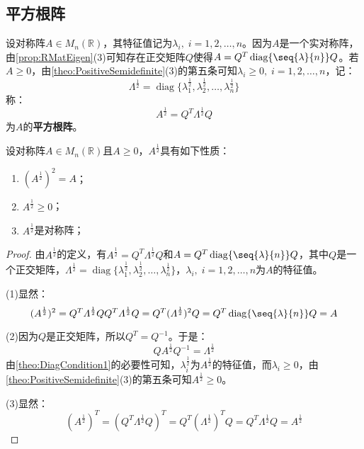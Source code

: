 \subsection{平方根阵}
\begin{definition}
	设对称阵$A\in M_n(\mathbb{R})$，其特征值记为$\lambda_i,\;i=1,2,\dots,n$。因为$A$是一个实对称阵，由\cref{prop:RMatEigen}(3)可知存在正交矩阵$Q$使得$A=Q^T\operatorname{diag}\{\seq{\lambda}{n}\}Q$。若$A\geqslant0$，由\cref{theo:PositiveSemidefinite}(3)的第五条可知$\lambda_i\geqslant0,\;i=1,2,\dots,n$，记：
	\begin{equation*}
		\varLambda^{\frac{1}{2}}=\operatorname{diag}\{\lambda_1^{\frac{1}{2}},\lambda_2^{\frac{1}{2}},\dots,\lambda_n^{\frac{1}{2}}\}
	\end{equation*}
	称：
	\begin{equation*}
		A^{\frac{1}{2}}=Q^T\varLambda^{\frac{1}{2}} Q
	\end{equation*}
	为$A$的\textbf{平方根阵}。
\end{definition}
\begin{property}\label{prop:SquareRootMat}
	设对称阵$A\in M_n(\mathbb{R})$且$A\geqslant0$，$A^{\frac{1}{2}}$具有如下性质：
	\begin{enumerate}
		\item $(A^{\frac{1}{2}})^2=A$；
		\item $A^{\frac{1}{2}}\geqslant0$；
		\item $A^{\frac{1}{2}}$是对称阵；
	\end{enumerate}
\end{property}
\begin{proof}
	由$A^{\frac{1}{2}}$的定义，有$A^{\frac{1}{2}}=Q^T\varLambda^{\frac{1}{2}}Q$和$A=Q^T\operatorname{diag}\{\seq{\lambda}{n}\}Q$，其中$Q$是一个正交矩阵，$\varLambda^{\frac{1}{2}}=\operatorname{diag}\{\lambda_1^{\frac{1}{2}},\lambda_2^{\frac{1}{2}},\dots,\lambda_n^{\frac{1}{2}}\}$，$\lambda_i,\;i=1,2,\dots,n$为$A$的特征值。\par
	(1)显然：
	\begin{equation*}
		(A^{\frac{1}{2}})^2=Q^T\varLambda^{\frac{1}{2}}QQ^T\varLambda^{\frac{1}{2}}Q=Q^T(\varLambda^{\frac{1}{2}})^2Q=Q^T\operatorname{diag}\{\seq{\lambda}{n}\}Q=A
	\end{equation*}\par
	(2)因为$Q$是正交矩阵，所以$Q^T=Q^{-1}$。于是：
	\begin{equation*}
		QA^{\frac{1}{2}}Q^{-1}=\varLambda^{\frac{1}{2}}
	\end{equation*}
	由\cref{theo:DiagCondition1}的必要性可知，$\lambda_i^{\frac{1}{2}}$为$A^{\frac{1}{2}}$的特征值，而$\lambda_i\geqslant0$，由\cref{theo:PositiveSemidefinite}(3)的第五条可知$A^{\frac{1}{2}}\geqslant0$。\par
	(3)显然：
	\begin{equation*}
		(A^{\frac{1}{2}})^T=(Q^T\varLambda^{\frac{1}{2}} Q)^T=Q^T(\varLambda^{\frac{1}{2}})^TQ=Q^T\varLambda^{\frac{1}{2}}Q=A^{\frac{1}{2}}
	\end{equation*}
\end{proof}
